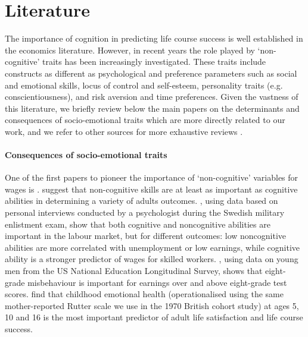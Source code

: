 \section{Literature \label{sec:lit}}

The importance of cognition in predicting life course success is well established in the economics literature. However, in recent years the role played by `non-cognitive' traits has been increasingly investigated. These traits include constructs as different as psychological and preference parameters such as social and emotional skills, locus of control and self-esteem, personality traits (e.g. conscientiousness), and risk aversion and time preferences. Given the vastness of this literature, we briefly review below the main papers on the determinants and consequences of socio-emotional traits which are more directly related to our work, and we refer to other sources for more exhaustive reviews \citep{Borghans2008,Almlund2011,Goodman2015,Kautz2014}.

\paragraph{Consequences of socio-emotional traits} One of the first papers to pioneer the importance of `non-cognitive' variables for wages is \cite{Bowles2001}. \cite{Heckman2006} suggest that non-cognitive skills are at least as important as cognitive abilities in determining a variety of adults outcomes. \citet{Lindqvist2011}, using data based on personal interviews conducted by a psychologist during the Swedish military enlistment exam, show that both cognitive and noncognitive abilities are important in the labour market, but for different outcomes: low noncognitive abilities are more correlated with unemployment or low earnings, while cognitive ability is a stronger predictor of wages for skilled workers. \citet{Segal2013}, using data on young men from the US National Education Longitudinal Survey, shows that eight-grade misbehaviour is important for earnings over and above eight-grade test scores. \citet{Layard2014} find that childhood emotional health (operationalised using the same mother-reported Rutter scale we use in the 1970 British cohort study) at ages 5, 10 and 16 is the most important predictor of adult life satisfaction and life course success.

